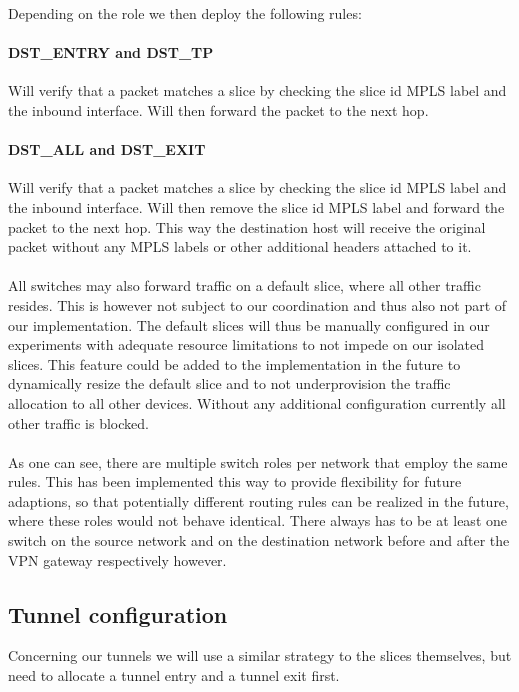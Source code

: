 Depending on the role we then deploy the following rules:

\paragraph{DST\_ENTRY and DST\_TP} Will verify that a packet matches a slice by checking the slice id MPLS label and the inbound interface. Will then forward the packet to the next hop.

\paragraph{DST\_ALL and DST\_EXIT} Will verify that a packet matches a slice by checking the slice id MPLS label and the inbound interface. Will then remove the slice id MPLS label and forward the packet to the next hop. This way the destination host will receive the original packet without any MPLS labels or other additional headers attached to it.

\paragraph{} All switches may also forward traffic on a default slice, where all other traffic resides. This is however not subject to our coordination and thus also not part of our implementation. The default slices will thus be manually configured in our experiments with adequate resource limitations to not impede on our isolated slices. This feature could be added to the implementation in the future to dynamically resize the default slice and to not underprovision the traffic allocation to all other devices. Without any additional configuration currently all other traffic is blocked.

\paragraph{} As one can see, there are multiple switch roles per network that employ the same rules. This has been implemented this way to provide flexibility for future adaptions, so that potentially different routing rules can be realized in the future, where these roles would not behave identical. There always has to be at least one switch on the source network and on the destination network before and after the VPN gateway respectively however.

\subsection{Tunnel configuration}
\label{impl_tunnel_config}
Concerning our tunnels we will use a similar strategy to the slices themselves, but need to allocate a tunnel entry and a tunnel exit first.

